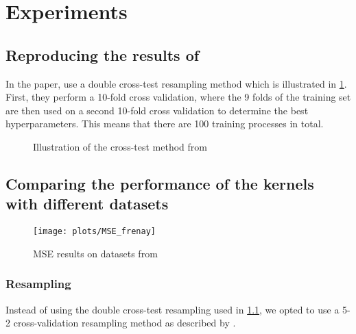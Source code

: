 \section{Experiments}

\subsection{Reproducing the results of \textcite{frenayParameterinsensitiveKernelExtreme2011}}
\label{sec:reproducing-frenay}


In the paper, \textcite{frenayParameterinsensitiveKernelExtreme2011} use a double cross-test resampling
method which is illustrated in \cref{fig:frenay-cross-test}. First, they perform a 10-fold cross validation,
where the 9 folds of the training set are then used on a second 10-fold cross validation to determine the
best hyperparameters. This means that there are 100 training processes in total.

\begin{figure}[H]
    
	\caption{Illustration of the cross-test method from \cite{frenayParameterinsensitiveKernelExtreme2011}}
	\label{fig:frenay-cross-test}
\end{figure}

\subsection{Comparing the performance of the kernels with different datasets}

\begin{figure}
    \texttt{[image: plots/MSE\_frenay]}
    \caption{MSE results on datasets from \cite{frenayParameterinsensitiveKernelExtreme2011}}
\end{figure}

\subsubsection{Resampling}

Instead of using the double cross-test resampling used in \cref{sec:reproducing-frenay},
we opted to use a 5-2 cross-validation resampling method as described by \textcite{dietterichApproximateStatisticalTests1998}.

